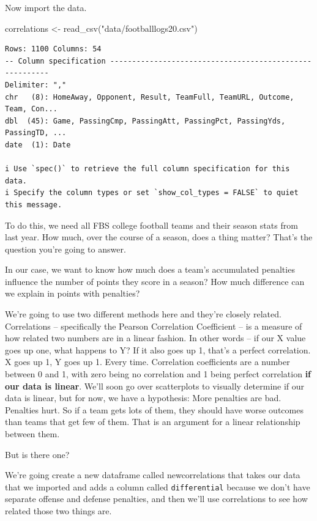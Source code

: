 \documentclass[
  letterpaper,
  DIV=11,
  numbers=noendperiod]{scrreprt}
\newenvironment{Shaded}{\begin{snugshade}}{\end{snugshade}}
\newcommand{\FunctionTok}[1]{\textcolor[rgb]{0.28,0.35,0.67}{#1}}
\newcommand{\NormalTok}[1]{\textcolor[rgb]{0.00,0.23,0.31}{#1}}
\newcommand{\OtherTok}[1]{\textcolor[rgb]{0.00,0.23,0.31}{#1}}
\newcommand{\StringTok}[1]{\textcolor[rgb]{0.13,0.47,0.30}{#1}}
\begin{document}
Now import the data.

\begin{Shaded}
\begin{Highlighting}[]
\NormalTok{correlations }\OtherTok{\textless{}{-}} \FunctionTok{read\_csv}\NormalTok{(}\StringTok{"data/footballlogs20.csv"}\NormalTok{)}
\end{Highlighting}
\end{Shaded}

\begin{verbatim}
Rows: 1100 Columns: 54
-- Column specification --------------------------------------------------------
Delimiter: ","
chr   (8): HomeAway, Opponent, Result, TeamFull, TeamURL, Outcome, Team, Con...
dbl  (45): Game, PassingCmp, PassingAtt, PassingPct, PassingYds, PassingTD, ...
date  (1): Date

i Use `spec()` to retrieve the full column specification for this data.
i Specify the column types or set `show_col_types = FALSE` to quiet this message.
\end{verbatim}

To do this, we need all FBS college football teams and their season
stats from last year. How much, over the course of a season, does a
thing matter? That's the question you're going to answer.

In our case, we want to know how much does a team's accumulated
penalties influence the number of points they score in a season? How
much difference can we explain in points with penalties?

We're going to use two different methods here and they're closely
related. Correlations -- specifically the Pearson Correlation
Coefficient -- is a measure of how related two numbers are in a linear
fashion. In other words -- if our X value goes up one, what happens to
Y? If it also goes up 1, that's a perfect correlation. X goes up 1, Y
goes up 1. Every time. Correlation coefficients are a number between 0
and 1, with zero being no correlation and 1 being perfect correlation
\textbf{if our data is linear}. We'll soon go over scatterplots to
visually determine if our data is linear, but for now, we have a
hypothesis: More penalties are bad. Penalties hurt. So if a team gets
lots of them, they should have worse outcomes than teams that get few of
them. That is an argument for a linear relationship between them.

But is there one?

We're going create a new dataframe called newcorrelations that takes our
data that we imported and adds a column called \texttt{differential}
because we don't have separate offense and defense penalties, and then
we'll use correlations to see how related those two things are.
\end{document}
